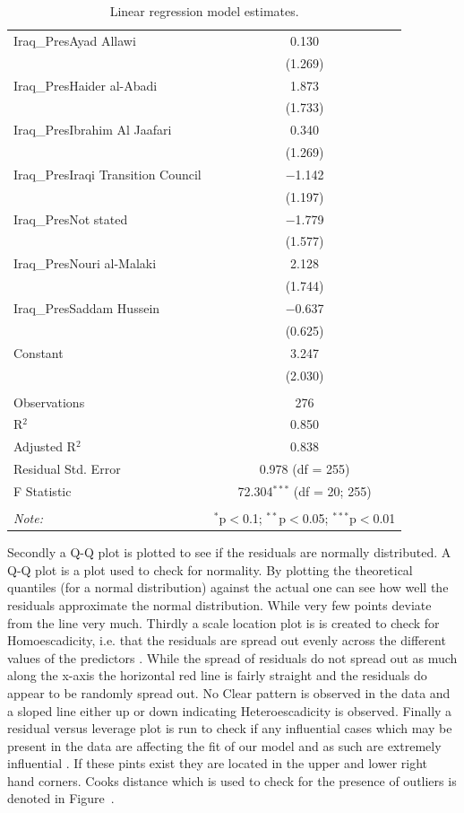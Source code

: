 \begin{table}[ht]
\begin{adjustbox}{width=1\textwidth}
\begin{tabular}{@{\extracolsep{5pt}}lc}
 Iraq\_PresAyad Allawi & 0.130 \\ 
  & (1.269) \\
 Iraq\_PresHaider al-Abadi & 1.873 \\ 
  & (1.733) \\
 Iraq\_PresIbrahim Al Jaafari & 0.340 \\ 
  & (1.269) \\
 Iraq\_PresIraqi Transition Council & $-$1.142 \\ 
  & (1.197) \\
 Iraq\_PresNot stated & $-$1.779 \\ 
  & (1.577) \\
 Iraq\_PresNouri al-Malaki & 2.128 \\ 
  & (1.744) \\
 Iraq\_PresSaddam Hussein & $-$0.637 \\ 
  & (0.625) \\
 Constant & 3.247 \\ 
  & (2.030) \\
\hline \\[-1.8ex] 
Observations & 276 \\ 
R$^{2}$ & 0.850 \\ 
Adjusted R$^{2}$ & 0.838 \\ 
Residual Std. Error & 0.978 (df = 255) \\ 
F Statistic & 72.304$^{***}$ (df = 20; 255) \\ 
\hline 
\hline \\[-1.8ex] 
\textit{Note:}  & \multicolumn{1}{r}{$^{*}$p$<$0.1; $^{**}$p$<$0.05; $^{***}$p$<$0.01} \\ 
\end{tabular} 
\end{adjustbox}
\caption{Linear regression model estimates.} 
\label{tab:linearreg} 
\end{table} 

Secondly a Q-Q plot is plotted to see if the residuals are normally distributed. A Q-Q plot is a plot used to check for normality. By plotting the theoretical quantiles (for a normal distribution) against the actual one can see how well the residuals approximate the normal distribution. While very few points deviate from the line very much. Thirdly a scale location plot is is created to check for Homoescadicity, i.e. that the residuals are spread out evenly across the different values of the predictors \citep{neter1996applied}. While the spread of residuals do not  spread out as much along the x-axis the horizontal red line is fairly straight and the residuals do appear to be randomly spread out. No Clear pattern is observed in the data and a sloped line either up or down indicating Heteroescadicity is observed. Finally a residual versus leverage plot is run to check if any influential cases which may be present in the data are affecting the fit of our model and as such are extremely influential \citep{sall1990leverage}.  If these pints exist they are located in the upper and lower right hand corners. Cooks distance \citep{chatterjee2009sensitivity} which is used to check for the presence of outliers is denoted in Figure~.

